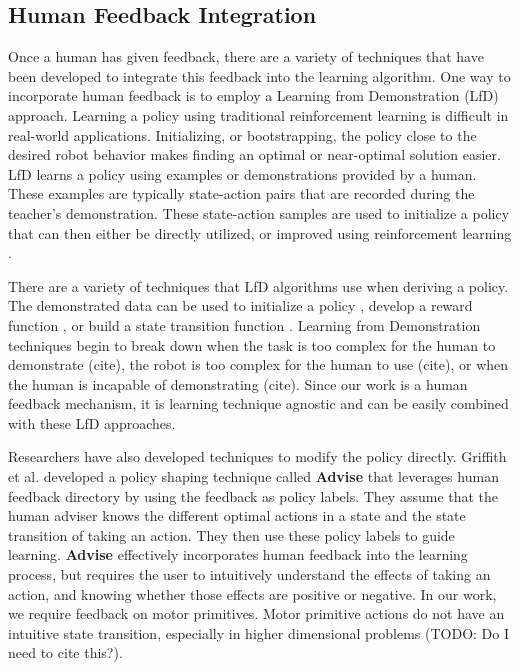 \documentclass[letterpaper, 10 pt, conference]{ieeeconf}
\begin{document}
\subsection{Human Feedback Integration}
Once a human has given feedback, there are a variety of techniques that have been developed to integrate this feedback into the learning algorithm. One way to incorporate human feedback is to employ a Learning from Demonstration (LfD) approach. Learning a policy using traditional reinforcement learning is difficult in real-world applications. Initializing, or bootstrapping, the policy close to the desired robot behavior makes finding an optimal or near-optimal solution easier. LfD learns a policy using examples or demonstrations provided by a human. These examples are typically state-action pairs that are recorded during the teacher's demonstration. These state-action samples are used to initialize a policy that can then either be directly utilized, or improved using reinforcement learning \cite{Argall:2009:SRL:1523530.1524008}.

There are a variety of techniques that LfD algorithms use when deriving a policy. The demonstrated data can be used to initialize a policy \cite{4058714}, develop a reward function \cite{Thomaz:2006:RLH:1597538.1597696}, or build a state transition function \cite{Argall:2009:SRL:1523530.1524008}. Learning from Demonstration techniques begin to break down when the task is too complex for the human to demonstrate (cite), the robot is too complex for the human to use (cite), or when the human is incapable of demonstrating (cite). Since our work is a human feedback mechanism, it is learning technique agnostic and can be easily combined with these LfD approaches.

Researchers have also developed techniques to modify the policy directly. Griffith et al. developed a policy shaping technique called \textbf{Advise} \cite{NIPS2013_5187} that leverages human feedback directory by using the feedback as policy labels. They assume that the human adviser knows the different optimal actions in a state and the state transition of taking an action. They then use these policy labels to guide learning. \textbf{Advise} effectively incorporates human feedback into the learning process, but requires the user to intuitively understand the effects of taking an action, and knowing whether those effects are positive or negative. In our work, we require feedback on motor primitives. Motor primitive actions do not have an intuitive state transition, especially in higher dimensional problems (TODO: Do I need to cite this?). 
\end{document}
